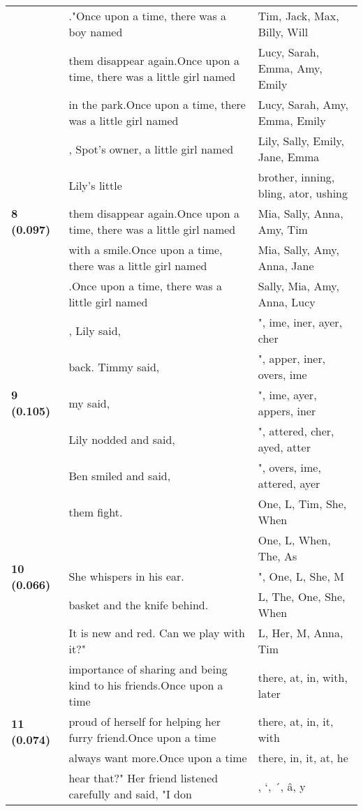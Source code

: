 \documentclass{article}
\begin{document}
\begin{adjustbox}{max width=\textwidth}
\begin{tabular}{p{} p{} p{}}
 & ."Once upon a time, there was a boy named & Tim,  Jack,  Max,  Billy,  Will \\
 & them disappear again.Once upon a time, there was a little girl named & Lucy,  Sarah,  Emma,  Amy,  Emily \\
 & in the park.Once upon a time, there was a little girl named & Lucy,  Sarah,  Amy,  Emma,  Emily \\
\midrule
\multirow{5}{*}{\textbf{8 (0.097)}} & , Spot's owner, a little girl named & Lily,  Sally,  Emily,  Jane,  Emma \\
 & Lily's little & brother, inning, bling, ator, ushing \\
 & them disappear again.Once upon a time, there was a little girl named & Mia,  Sally,  Anna,  Amy,  Tim \\
 & with a smile.Once upon a time, there was a little girl named & Mia,  Sally,  Amy,  Anna,  Jane \\
 & .Once upon a time, there was a little girl named & Sally,  Mia,  Amy,  Anna,  Lucy \\
\midrule
\multirow{5}{*}{\textbf{9 (0.105)}} & , Lily said, & ", ime, iner, ayer, cher \\
 & back. Timmy said, & ", apper, iner, overs, ime \\
 & my said, & ", ime, ayer, appers, iner \\
 & Lily nodded and said, & ", attered, cher, ayed, atter \\
 & Ben smiled and said, & ", overs, ime, attered, ayer \\
\midrule
\multirow{5}{*}{\textbf{10 (0.066)}} & them fight. & One, L, Tim, She, When \\
 &  & One, L, When, The, As \\
 & She whispers in his ear. & ", One, L, She, M \\
 & basket and the knife behind. & L, The, One, She, When \\
 & It is new and red. Can we play with it?" & L, Her, M, Anna, Tim \\
\midrule
\multirow{5}{*}{\textbf{11 (0.074)}} & importance of sharing and being kind to his friends.Once upon a time & there,  at,  in,  with,  later \\
 & proud of herself for helping her furry friend.Once upon a time & there,  at,  in,  it,  with \\
 & always want more.Once upon a time & there,  in,  it,  at,  he \\
 & hear that?" Her friend listened carefully and said, "I don & , `, ´, â, y \\

\end{tabular}
\end{adjustbox}
\end{document}

